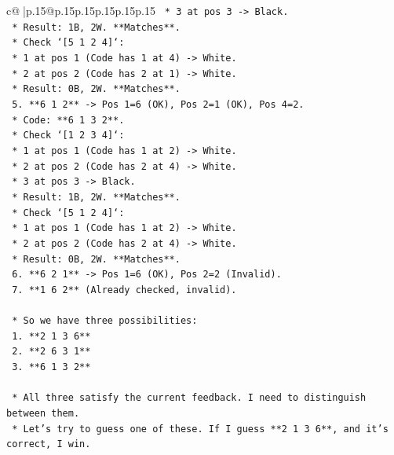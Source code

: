 \documentclass{article}
\begin{document}
{\begin{supertabular}{c@{$\;$}|p{.15\linewidth}@{}p{.15\linewidth}p{.15\linewidth}p{.15\linewidth}p{.15\linewidth}p{.15\linewidth}}
{{{\texttt{                    *   3 at pos 3 {-}> Black.} \\
\texttt{                    *   Result: 1B, 2W. **Matches**.} \\
\texttt{                *   Check `{[}5 1 2 4{]}`:} \\
\texttt{                    *   1 at pos 1 (Code has 1 at 4) {-}> White.} \\
\texttt{                    *   2 at pos 2 (Code has 2 at 1) {-}> White.} \\
\texttt{                    *   Result: 0B, 2W. **Matches**.} \\
\texttt{            5.  **6 1 2** {-}> Pos 1=6 (OK), Pos 2=1 (OK), Pos 4=2.} \\
\texttt{                *   Code: **6 1 3 2**.} \\
\texttt{                *   Check `{[}1 2 3 4{]}`:} \\
\texttt{                    *   1 at pos 1 (Code has 1 at 2) {-}> White.} \\
\texttt{                    *   2 at pos 2 (Code has 2 at 4) {-}> White.} \\
\texttt{                    *   3 at pos 3 {-}> Black.} \\
\texttt{                    *   Result: 1B, 2W. **Matches**.} \\
\texttt{                *   Check `{[}5 1 2 4{]}`:} \\
\texttt{                    *   1 at pos 1 (Code has 1 at 2) {-}> White.} \\
\texttt{                    *   2 at pos 2 (Code has 2 at 4) {-}> White.} \\
\texttt{                    *   Result: 0B, 2W. **Matches**.} \\
\texttt{            6.  **6 2 1** {-}> Pos 1=6 (OK), Pos 2=2 (Invalid).} \\
\texttt{            7.  **1 6 2** (Already checked, invalid).} \\
\\ 
\texttt{    *   So we have three possibilities:} \\
\texttt{        1.  **2 1 3 6**} \\
\texttt{        2.  **2 6 3 1**} \\
\texttt{        3.  **6 1 3 2**} \\
\\ 
\texttt{    *   All three satisfy the current feedback. I need to distinguish between them.} \\
\texttt{    *   Let's try to guess one of these. If I guess **2 1 3 6**, and it's correct, I win.} \\
}}}
\end{supertabular}}
\end{document}
